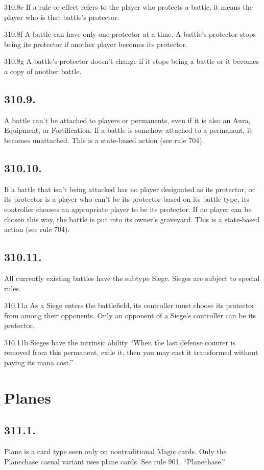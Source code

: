 310.8e If a rule or effect refers to the player who protects a battle, it means the player who is that battle’s protector.

310.8f A battle can have only one protector at a time. A battle’s protector stops being its protector if another player becomes its protector.

310.8g A battle’s protector doesn’t change if it stops being a battle or it becomes a copy of another battle.

\subsection*{310.9.}
A battle can’t be attached to players or permanents, even if it is also an Aura, Equipment, or Fortification. If a battle is somehow attached to a permanent, it becomes unattached. This is a state-based action (see rule 704).

\subsection*{310.10.}
If a battle that isn’t being attacked has no player designated as its protector, or its protector is a player who can’t be its protector based on its battle type, its controller chooses an appropriate player to be its protector. If no player can be chosen this way, the battle is put into its owner’s graveyard. This is a state-based action (see rule 704).

\subsection*{310.11.}
All currently existing battles have the subtype Siege. Sieges are subject to special rules.

310.11a As a Siege enters the battlefield, its controller must choose its protector from among their opponents. Only an opponent of a Siege’s controller can be its protector.

310.11b Sieges have the intrinsic ability “When the last defense counter is removed from this permanent, exile it, then you may cast it transformed without paying its mana cost.”

\section{Planes}
\subsection*{311.1.}
Plane is a card type seen only on nontraditional Magic cards. Only the Planechase casual variant uses plane cards. See rule 901, “Planechase.”

